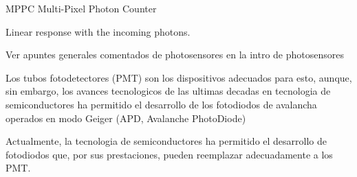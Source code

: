MPPC Multi-Pixel Photon Counter

Linear response with the incoming photons.

Ver apuntes generales comentados de photosensores en la intro de photosensores

Los tubos fotodetectores (PMT) son los dispositivos adecuados para esto, aunque, sin embargo, los avances tecnologicos de las ultimas decadas en tecnologia de semiconductores ha permitido el desarrollo de los fotodiodos de avalancha operados en modo Geiger (APD, Avalanche PhotoDiode)

Actualmente, la tecnologia de semiconductores ha permitido el desarrollo de fotodiodos que, por sus prestaciones, pueden reemplazar adecuadamente a los PMT. 